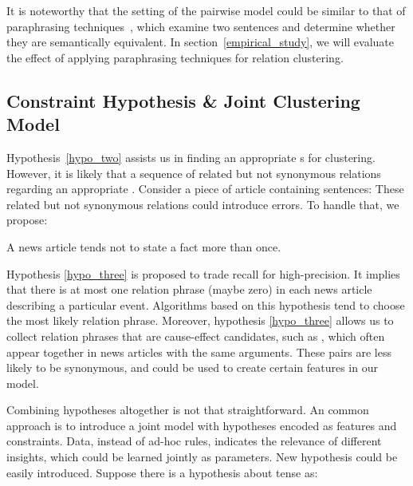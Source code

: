 It is noteworthy that the setting of the pairwise model could be similar to that of paraphrasing techniques~\cite{dolan2005automatically,SocherEtAl2011:PoolRAE}, which examine two sentences and determine whether they are semantically equivalent. In section~\ref{empirical_study}, we will evaluate the effect of applying paraphrasing techniques for relation clustering.

\subsection{Constraint Hypothesis \& Joint Clustering Model}
\label{section_joint_cluster_model}
Hypothesis~\ref{hypo_two} assists us in finding an appropriate \eec s for clustering. However, it is likely that a sequence of related but not synonymous relations regarding an appropriate \eec. Consider a piece of article containing sentences:  These related but not synonymous relations could introduce errors. To handle that, we propose:

\begin{hypothesis}
	\label{hypo_three}
A news article tends not to state a fact more than once.
\end{hypothesis}

Hypothesis \ref{hypo_three} is proposed to trade recall for high-precision. It implies that there is at most one relation phrase (maybe zero) in each news article describing a particular event. Algorithms based on this hypothesis tend to choose the most likely relation phrase. Moreover, hypothesis \ref{hypo_three} allows us to collect relation phrases that are cause-effect candidates, such as , which often appear together in news articles with the same arguments. These pairs are less likely to be synonymous, and could be used to create certain features in our model.

Combining hypotheses altogether is not that straightforward. %
An common approach is to introduce a joint model with hypotheses encoded as features and constraints. Data, instead of ad-hoc rules, indicates the relevance of different insights, which could be learned jointly as parameters. New hypothesis could be easily introduced. Suppose there is a hypothesis about tense as:

